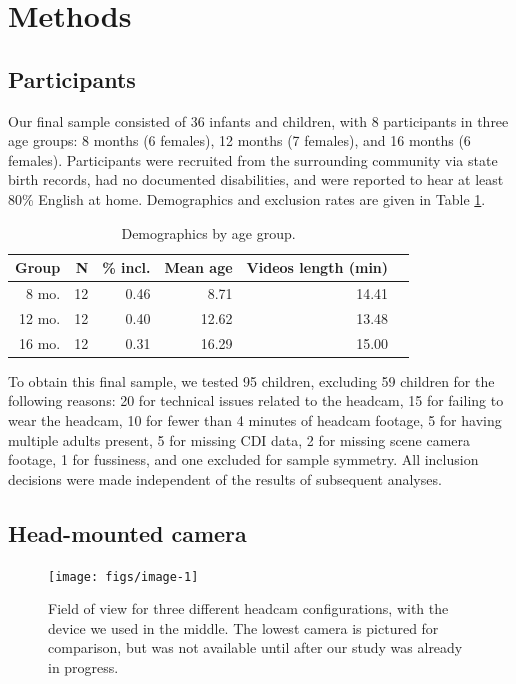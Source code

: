 \documentclass[10pt, letterpaper]{article}
\newenvironment{CodeChunk}{}{}
\begin{document}
\section{Methods}\label{methods}

\subsection{Participants}\label{participants}

Our final sample consisted of 36 infants and children, with 8
participants in three age groups: 8 months (6 females), 12 months (7
females), and 16 months (6 females). Participants were recruited from
the surrounding community via state birth records, had no documented
disabilities, and were reported to hear at least 80\% English at home.
Demographics and exclusion rates are given in Table \ref{tab:pop}.

\begin{table}[H]
\centering
\begin{tabular}{rrrrrr}
  \hline
 Group & N & \% incl. & Mean age & Videos length (min) \\ 
  \hline
   8 mo. &   12 & 0.46 & 8.71 & 14.41 \\ 
   12 mo. &  12 & 0.40 & 12.62 & 13.48 \\ 
   16 mo. &  12 & 0.31 & 16.29 & 15.00\\ 
   \hline
\end{tabular}
\caption{\label{tab:pop} Demographics by age group.}
\end{table}

To obtain this final sample, we tested 95 children, excluding 59
children for the following reasons: 20 for technical issues related to
the headcam, 15 for failing to wear the headcam, 10 for fewer than 4
minutes of headcam footage, 5 for having multiple adults present, 5 for
missing CDI data, 2 for missing scene camera footage, 1 for fussiness,
and one excluded for sample symmetry. All inclusion decisions were made
independent of the results of subsequent analyses.

\subsection{Head-mounted camera}\label{head-mounted-camera}

\begin{CodeChunk}
\begin{figure}[H]

{\centering \texttt{[image: figs/image-1]} 

}

\caption[Field of view for three different headcam configurations, with the device we used in the middle]{Field of view for three different headcam configurations, with the device we used in the middle. The lowest camera is pictured for comparison, but was not available until after our study was already in progress.}\label{fig:image}
\end{figure}
\end{CodeChunk}
\end{document}
